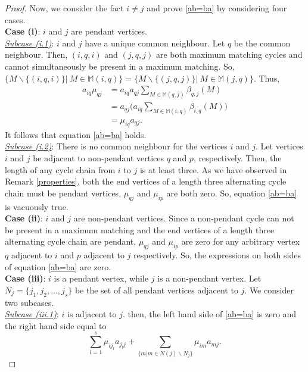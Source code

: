 \documentclass[10pt,a4paper]{amsart}
\begin{document}
\begin{proof}
Now, we consider the fact $i\neq j$ and prove \ref{ab=ba} by considering four cases.\\
{\bf Case (i)}: $i$ and $j$ are pendant vertices.\\ 
\underline{{\it Subcase \rm{(i.1)}}}: $i$ and $j$ have a unique common neighbour. Let $q$ be the common neighbour. Then, $(i,q,i)$ and $(j,q,j)$ are both maximum matching cycles and cannot simultaneously be present in a maximum
matching. So, $\{M\backslash \{(i,q,i)\}\vert ~M\in \mathbb{M}(i,q)\}=\{M\backslash \{(j,q,j)\}\vert ~M\in \mathbb{M}(j,q)\}$. Thus,
\begin{align*}
a_{iq}\mu _{qj}& =a_{iq}a_{qj}\sum _{M\in \mathbb{M}(q,j)}\beta _{\overline{q,j}}(M) \\
 &= a_{qj}\Big (a_{iq}\sum _{M\in \mathbb{M}(i,q)}\beta _{\overline{i,q}}(M)\Big ) \\
 &= \mu _{iq}a_{qj}. 
\end{align*} 
It follows that equation \ref{ab=ba} holds.\\
\underline{{\it Subcase \rm{(i.2)}}}: There is no common neighbour for the vertices $i$ and $j$. Let vertices $i$ and $j$ be adjacent to non-pendant vertices $q$ and $p$, respectively. Then, the length of any cycle chain from $i$ to $j$ is at least three. As we have observed in Remark \ref{properties}, both the end vertices of a length three alternating cycle chain must be pendant vertices, $\mu _{qj}$ and $\mu _{ip}$ are both zero. So, equation \ref{ab=ba} is vacuously true.\\
{\bf Case (ii)}: $i$ and $j$ are non-pendant vertices. Since a non-pendant cycle can not be present in a maximum matching and the end vertices of a length three alternating cycle chain are pendant, $\mu _{qj}$ and $\mu _{ip}$ are zero for any arbitrary vertex $q$ adjacent to $i$ and $p$ adjacent to $j$ respectively. So, the expressions on both sides of equation \ref{ab=ba} are zero.\\
{\bf Case (iii)}: $i$ is a pendant vertex, while $j$ is a non-pendant vertex. Let $N_j=\{j_1,j_2,\ldots ,j_s\}$ be the set of all pendant vertices adjacent to $j$. We consider two subcases.\\
\underline{{\it Subcase \rm{(iii.1)}}}: $i$ is adjacent to $j$. then, the left hand side of \ref{ab=ba} is zero and the right hand side equal to
\begin{equation}\label{split}
\sum _{l=1}^s\mu _{ij_l} a_{j_lj} + \sum _{\{m\vert m \in N(j)\backslash N_j\}}\mu _{im} a_{mj}.
\end{equation}

\end{proof}
\end{document}
